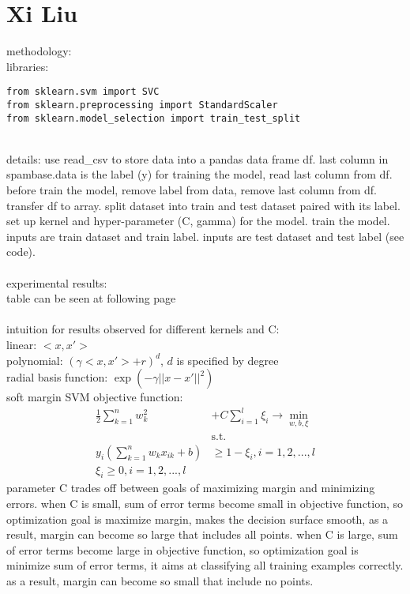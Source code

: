 \documentclass[12pt, border = 4pt, multi]{article} %
\begin{document}
\section*{Xi Liu}
methodology:\\
libraries: 
\begin{verbatim}
from sklearn.svm import SVC
from sklearn.preprocessing import StandardScaler
from sklearn.model_selection import train_test_split
\end{verbatim}\\
details: use read\_csv to store data into a pandas data frame df. last column in spambase.data is the label (y) for training the model, read last column from df. before train the model, remove label from data, remove last column from df. transfer df to array. split dataset into train and test dataset paired with its label. set up kernel and hyper-parameter (C, gamma) for the model. train the model. inputs are train dataset and train label. inputs are test dataset and test label (see code).\\
\\
experimental results:\\
table can be seen at following page\\
\\
intuition for results observed for different kernels and C:\\
linear: $<x, x'>$\\
polynomial: $(\gamma<x, x'> + r) ^ d$, $d$ is specified by degree\\
radial basis function: $\exp(-\gamma||x - x'|| ^ 2)$\\
soft margin SVM objective function:
\begin{align*}
\frac{1}{2}\sum_{k = 1} ^ n w_k ^ 2 &+ C\sum_{i = 1} ^ l \xi_i \rightarrow \min_{w, b, \xi}\\
&\text{s.t.}\\
y_i\left(\sum_{k = 1} ^ n w_k x_{ik} + b\right) &\geq 1 - \xi_i, i = 1, 2, ..., l\\
\xi_i \geq 0, i = 1, 2, ..., l
\end{align*}
parameter C trades off between goals of maximizing margin and minimizing errors. when C is small, sum of error terms become small in objective function, so optimization goal is maximize margin, makes the decision surface smooth, as a result, margin can become so large that includes all points. when C is large, sum of error terms become large in objective function, so optimization goal is minimize sum of error terms, it aims at classifying all training examples correctly. as a result, margin can become so small that include no points.\\
\end{document}
